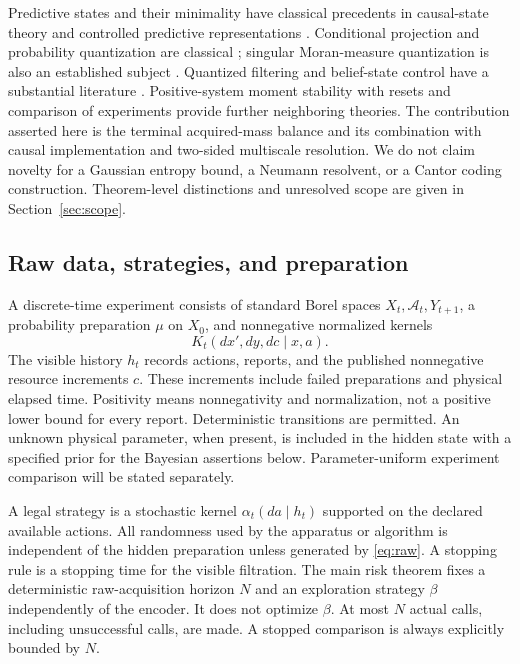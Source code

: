 Predictive states and their minimality have classical precedents in causal-state theory and controlled predictive representations \cite{shalizi,psr}. Conditional projection and probability quantization are classical \cite{graf}; singular Moran-measure quantization is also an established subject \cite{zhu-moran}. Quantized filtering and belief-state control have a substantial literature \cite{pages,sellami,feuer,saldi}. Positive-system moment stability with resets \cite{ogura} and comparison of experiments \cite{blackwell,lecam,torgersen} provide further neighboring theories. The contribution asserted here is the terminal acquired-mass balance and its combination with causal implementation and two-sided multiscale resolution. We do not claim novelty for a Gaussian entropy bound, a Neumann resolvent, or a Cantor coding construction. Theorem-level distinctions and unresolved scope are given in Section~\ref{sec:scope}.

\subsection{Raw data, strategies, and preparation}
A discrete-time experiment consists of standard Borel spaces $X_t,\mathcal A_t,Y_{t+1}$, a probability preparation $\mu$ on $X_0$, and nonnegative normalized kernels
\begin{equation}\label{eq:raw}
 K_t(dx',dy,dc\mid x,a).
\end{equation}
The visible history $h_t$ records actions, reports, and the published nonnegative resource increments $c$. These increments include failed preparations and physical elapsed time. Positivity means nonnegativity and normalization, not a positive lower bound for every report. Deterministic transitions are permitted. An unknown physical parameter, when present, is included in the hidden state with a specified prior for the Bayesian assertions below. Parameter-uniform experiment comparison will be stated separately.

A legal strategy is a stochastic kernel $\alpha_t(da\mid h_t)$ supported on the declared available actions. All randomness used by the apparatus or algorithm is independent of the hidden preparation unless generated by \eqref{eq:raw}. A stopping rule is a stopping time for the visible filtration. The main risk theorem fixes a deterministic raw-acquisition horizon $N$ and an exploration strategy $\beta$ independently of the encoder. It does not optimize $\beta$. At most $N$ actual calls, including unsuccessful calls, are made. A stopped comparison is always explicitly bounded by $N$.

